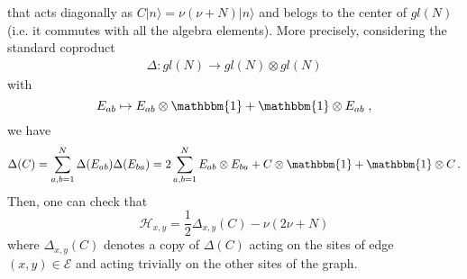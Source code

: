 \documentclass[10pt]{article}
\numberwithin{equation}{section}
\numberwithin{equation}{subsection}
\newcommand{\co}{\;,}
\newcommand{\twoj}{\nu}
\begin{document}
that acts diagonally as $C|{n}\rangle=\twoj(\twoj+N)|{n}\rangle$ and belogs to the center of ${gl}(N)$ (i.e. it commutes with all the algebra elements).  
More precisely,  considering the standard coproduct 
\begin{equation}
\begin{split}
\Delta:{gl}(N)\to {gl}(N)\otimes {gl}(N)
\end{split}
\end{equation}
with
\begin{equation}
E_{ab}\mapsto E_{ab}\otimes \mathbbm{1}+\mathbbm{1}\otimes E_{ab}\co
\end{equation} 
we have 
\begin{equation}
\Delta(C)=\sum_{a,b=1}^{N}\Delta(E_{ab})\Delta(E_{ba})=2\sum_{a,b=1}^{N}E_{ab}\otimes E_{ba}+C\otimes \mathbbm{1}+\mathbbm{1}\otimes C\,.
\end{equation}
Then, one can check that 
\begin{equation}\label{hamiltonianCasimir}
	\mathcal{H}_{x,y}=\frac{1}{2}\Delta_{x,y}(C)-\twoj(2\twoj+N)
\end{equation}
where $\Delta_{x,y}(C)$ denotes a copy of $\Delta(C)$ acting on  the sites of edge $(x,y)\in \mathcal{E}$ and acting trivially on the other sites of the graph.
\end{document}
